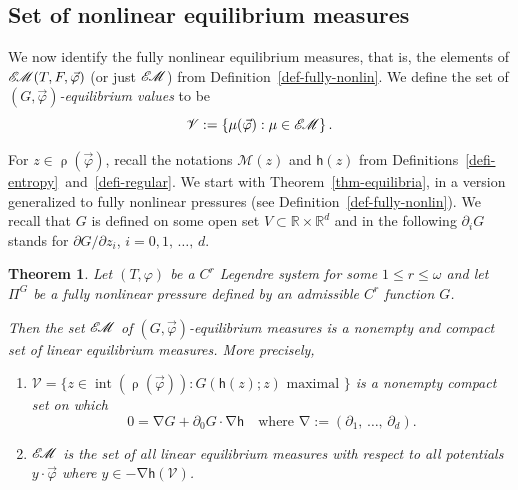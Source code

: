 \documentclass[10pt]{amsart}
\newtheorem{theo}{Theorem}[section]
\theoremstyle{definition}\newtheorem{defi}[theo]{Definition}\newtheorem{rema}[theo]{Remark}\newtheorem{exam}[theo]{Example}\newtheorem{exem}[theo]{Example}\newtheorem{nota}[theo]{Notation}
\theoremstyle{plain}
\theoremstyle{plain}
\newcommand\vpot{\vec\pot}
\DeclareMathOperator{\interior}{int}
\newcommand{\rs}{\operatorname{\rho}}
\newcommand{\grad}{\operatorname{\nabla}}
\newcommand{\hf}{\mathsf{h}}
\newcommand{\EM}{\mathscr{E\kern-2pt M}}
\newcommand{\pot}{\varphi}
\newcommand*\8{\infty}
\newcommand*\R{\mathbb{R}}
\newcommand{\cM}{\mathcal{M}}
\newcommand{\scV}{\mathscr{V}}
\newcommand*{\romanenumi}{\renewcommand*{\theenumi}{\roman{enumi}}}
\begin{document}
\subsection{Set of nonlinear equilibrium measures}


We now identify the fully nonlinear equilibrium measures, that is, the elements of $\EM(T,F,\vpot)$ (or just $\EM$) from Definition~\ref{def-fully-nonlin}. We define the set of \emph{$(G,\vpot)$-equilibrium values} to be
\[
\scV:=\left\{\mu(\vpot):\mu\in\EM\right\}.
\]

For $ z\in \rs(\vpot)$, recall the notations $\cM(z)$ and $\hf(z)$ from Definitions~\ref{defi-entropy}~and~\ref{defi-regular}. We start with Theorem~\ref{thm-equilibria}, in a version generalized to fully nonlinear pressures (see Definition~\ref{def-fully-nonlin}). We recall that $G$ is defined on some open set $V\subset \R\times \R^{d}$ and in the following $\partial_{i}G$ stands for $\partial G/\partial z_{i}$, $i=0,1,\,\ldots,\,d$.

\begin{theo}\label{thm:equilibria-G}
Let $(T, \pot)$ be a {$C^r$ Legendre system} for some $1\leq r\leq\omega$ and let $\Pi^G$ be a fully nonlinear pressure defined by an admissible $C^r$ function $G$.

Then the set $\EM$ of $(G,\vpot)$-equilibrium measures is a nonempty and compact set of linear equilibrium measures. More precisely,
\begin{enumerate}\romanenumi
\item\label{enumi:equilibria-G-i}
$\scV = \{ z\in\interior(\rs(\vpot)):G(\hf(z); z)\text{ maximal }\}$ is a nonempty compact set on which
\begin{equation}\label{eq-gradg}
0 = \grad G + \partial_{0} G \cdot \grad \hf \quad \text{where } \grad := \left(\partial_1,\,\dots,\,\partial_d\right).
\end{equation}
\item\label{enumi:equilibria-G-ii}
$ \EM$ is the set of all linear equilibrium measures with respect to all potentials $y\cdot\vec\pot$ where $y \in -\grad \hf(\scV)$.
\end{enumerate}
\end{theo}
\end{document}
